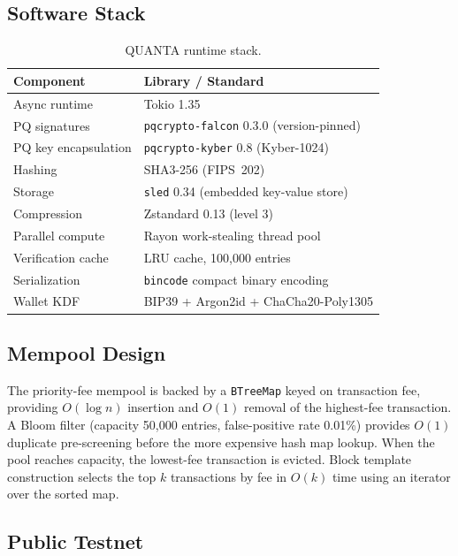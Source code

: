 \documentclass[11pt,a4paper]{article}
\begin{document}
\subsection{Software Stack}

\begin{table}[h]
\centering
\small
\begin{tabular}{@{}ll@{}}
\toprule
\textbf{Component} & \textbf{Library / Standard} \\
\midrule
Async runtime        & Tokio 1.35 \\
PQ signatures        & \texttt{pqcrypto-falcon} 0.3.0 (version-pinned) \\
PQ key encapsulation & \texttt{pqcrypto-kyber} 0.8 (Kyber-1024) \\
Hashing              & SHA3-256 (FIPS~202) \\
Storage              & \texttt{sled} 0.34 (embedded key-value store) \\
Compression          & Zstandard 0.13 (level 3) \\
Parallel compute     & Rayon work-stealing thread pool \\
Verification cache   & LRU cache, 100,000 entries \\
Serialization        & \texttt{bincode} compact binary encoding \\
Wallet KDF           & BIP39 + Argon2id + ChaCha20-Poly1305 \\
\bottomrule
\end{tabular}
\caption{QUANTA runtime stack.}
\label{tab:stack}
\end{table}

\subsection{Mempool Design}

The priority-fee mempool is backed by a \texttt{BTreeMap} keyed on transaction
fee, providing $O(\log n)$ insertion and $O(1)$ removal of the highest-fee
transaction. A Bloom filter (capacity 50,000 entries, false-positive rate
0.01\%) provides $O(1)$ duplicate pre-screening before the more expensive hash
map lookup. When the pool reaches capacity, the lowest-fee transaction is
evicted. Block template construction selects the top $k$ transactions by fee
in $O(k)$ time using an iterator over the sorted map.

\subsection{Public Testnet}
\end{document}
